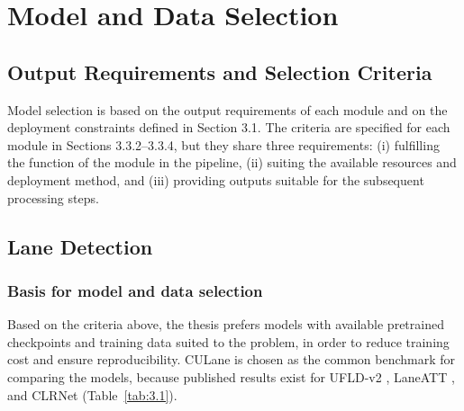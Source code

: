 \documentclass[12pt,a4paper]{report}
\begin{document}
\section{Model and Data Selection}

\subsection{Output Requirements and Selection Criteria}

Model selection is based on the output requirements of each module and on the deployment constraints defined in Section 3.1. The criteria are specified for each module in Sections 3.3.2--3.3.4, but they share three requirements: (i) fulfilling the function of the module in the pipeline, (ii) suiting the available resources and deployment method, and (iii) providing outputs suitable for the subsequent processing steps.

\subsection{Lane Detection}

\subsubsection*{Basis for model and data selection}

Based on the criteria above, the thesis prefers models with available pretrained checkpoints and training data suited to the problem, in order to reduce training cost and ensure reproducibility. CULane \cite{pan2018culane} is chosen as the common benchmark for comparing the models, because published results exist for UFLD-v2 \cite{qin2022ufldv2}, LaneATT \cite{tabelini2021laneatt}, and CLRNet \cite{zheng2022clrnet} (Table~\ref{tab:3.1}).
\end{document}
